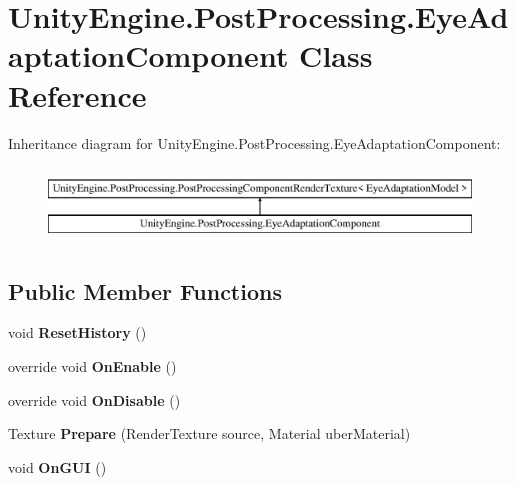 \hypertarget{class_unity_engine_1_1_post_processing_1_1_eye_adaptation_component}{}\section{Unity\+Engine.\+Post\+Processing.\+Eye\+Adaptation\+Component Class Reference}
\label{class_unity_engine_1_1_post_processing_1_1_eye_adaptation_component}
Inheritance diagram for Unity\+Engine.\+Post\+Processing.\+Eye\+Adaptation\+Component\+:\begin{figure}[H]
\begin{center}
\leavevmode
\includegraphics[height=2.000000cm]{class_unity_engine_1_1_post_processing_1_1_eye_adaptation_component}
\end{center}
\end{figure}
\subsection*{Public Member Functions}
\begin{DoxyCompactItemize}
\item 
\mbox{\label{class_unity_engine_1_1_post_processing_1_1_eye_adaptation_component_a461fa3fb6ad4571e4d860ed8c7c0beb4}} 
void {\bfseries Reset\+History} ()
\item 
\mbox{\label{class_unity_engine_1_1_post_processing_1_1_eye_adaptation_component_a1fd3a905eb93bbb912e2316baa1b1396}} 
override void {\bfseries On\+Enable} ()
\item 
\mbox{\label{class_unity_engine_1_1_post_processing_1_1_eye_adaptation_component_a983236f00adbfa6c477423ecf2d55eec}} 
override void {\bfseries On\+Disable} ()
\item 
\mbox{\label{class_unity_engine_1_1_post_processing_1_1_eye_adaptation_component_af6319d4a0410aedaa227fe1725e70309}} 
Texture {\bfseries Prepare} (Render\+Texture source, Material uber\+Material)
\item 
\mbox{\label{class_unity_engine_1_1_post_processing_1_1_eye_adaptation_component_a3f25f90f406ea8d9ae4e51194c802a71}} 
void {\bfseries On\+G\+UI} ()
\end{DoxyCompactItemize}
